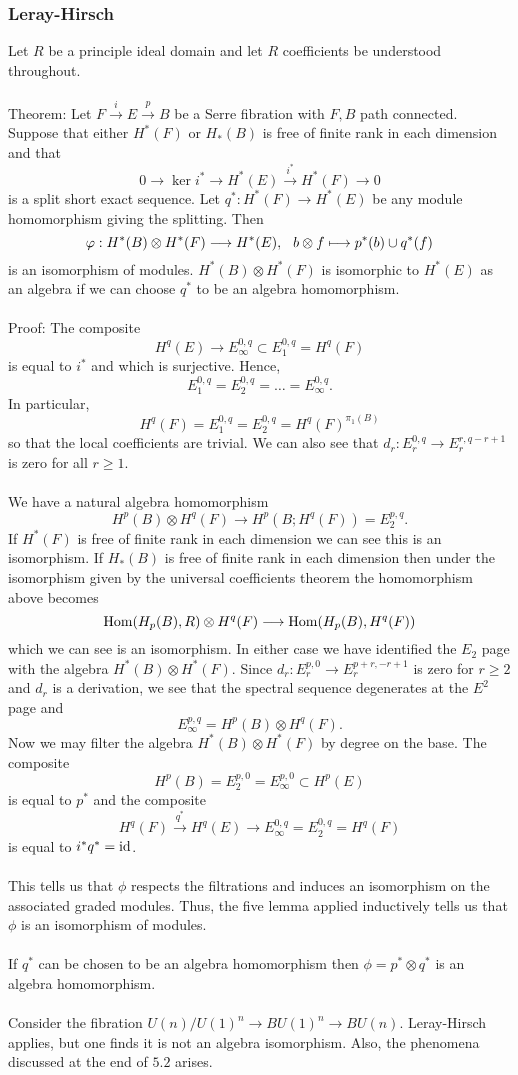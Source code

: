 \documentclass[11pt]{article}
\begin{document}
\begin{Jandr SSS notes}
	\subsubsection{Leray-Hirsch}
Let $R$ be a principle ideal domain and let $R$ coefficients be understood throughout.\\
\\
Theorem: Let $F\overset{i}{\to} E\overset{p}{\to} B$ be a Serre fibration with $F,B$ path connected. Suppose that either $H^*(F)$ or $H_*(B)$ is free of finite rank in each dimension and that
\[0\to\ker i^*\to H^*(E)\overset{i^*}{\to}H^*(F)\to 0\]
is a split short exact sequence. Let $q^*:H^*(F)\to H^*(E)$ be any module homomorphism giving the splitting. Then
\[\phi:H^*(B)\otimes H^*(F)\to H^*(E),\hspace{7 pt}
b\otimes f\mapsto p^*(b)\cup q^*(f)\]
is an isomorphism of modules. $H^*(B)\otimes H^*(F)$ is isomorphic to $H^*(E)$ as an algebra if we can choose $q^*$ to be an algebra homomorphism.\\
\\
Proof: The composite
\[H^q(E)\to E_{\infty}^{0,q}\subset E_1^{0,q}=H^q(F)\]
is equal to $i^*$ and which is surjective. Hence,
\[E_1^{0,q}=E_2^{0,q}=\ldots=E_{\infty}^{0,q}.\]
In particular,
\[H^q(F)=E_1^{0,q}=E_2^{0,q}=H^q(F)^{\pi_1(B)}\]
so that the local coefficients are trivial. We can also see that $d_r:E_r^{0,q}\to E_r^{r,q-r+1}$ is zero for all $r\geq 1$.\\
\\
We have a natural algebra homomorphism
\[H^p(B)\otimes H^q(F)\to H^p(B;H^q(F))=E_2^{p,q}.\]
If $H^*(F)$ is free of finite rank in each dimension we can see this is an isomorphism. If $H_*(B)$ is free of finite rank in each dimension then under the isomorphism given by the universal coefficients theorem the homomorphism above becomes
\[\Hom(H_p(B),R)\otimes H^q(F)\to\Hom(H_p(B),H^q(F))\]
which we can see is an isomorphism. In either case we have identified the $E_2$ page with the algebra $H^*(B)\otimes H^*(F)$. Since $d_r:E_r^{p,0}\to E_r^{p+r,-r+1}$ is zero for $r\geq 2$ and $d_r$ is a derivation, we see that the spectral sequence degenerates at the $E^2$ page and
\[E_{\infty}^{p,q}=H^p(B)\otimes H^q(F).\]
Now we may filter the algebra $H^*(B)\otimes H^*(F)$ by degree on the base. The composite
\[H^p(B)=E_2^{p,0}=E_{\infty}^{p,0}\subset H^p(E)\]
is equal to $p^*$ and the composite
\[H^q(F)\overset{q^*}{\to}H^q(E)\to E_{\infty}^{0,q}=E_2^{0,q}=H^q(F)\]
is equal to $i^*q^*=\id$.\\
\\
This tells us that $\phi$ respects the filtrations and induces an isomorphism on the associated graded modules. Thus, the five lemma applied inductively tells us that $\phi$ is an isomorphism of modules.\\
\\
If $q^*$ can be chosen to be an algebra homomorphism then $\phi=p^*\otimes q^*$ is an algebra homomorphism.\\
\\
Consider the fibration $U(n)/U(1)^n\to BU(1)^n\to BU(n)$. Leray-Hirsch applies, but one finds it is not an algebra isomorphism. Also, the phenomena discussed at the end of $5.2$ arises.



\end{Jandr SSS notes}
\end{document}
